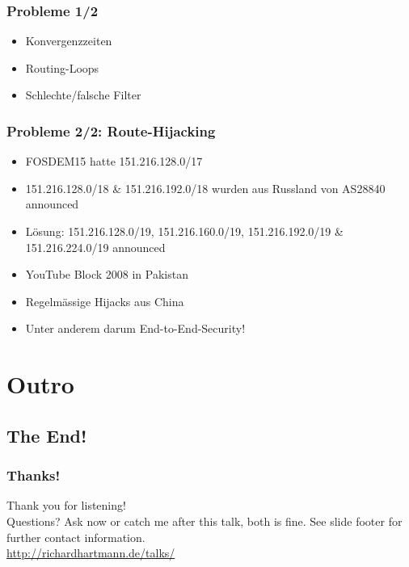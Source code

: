 \documentclass[t]{beamer}
\begin{document}
\begin{frame}
	\frametitle{Probleme 1/2}
	\begin{itemize}
		\item Konvergenzzeiten
		\item Routing-Loops
		\item Schlechte/falsche Filter
	\end{itemize}
\end{frame}

\begin{frame}
	\frametitle{Probleme 2/2: Route-Hijacking}
	\begin{itemize}
		\item FOSDEM15 hatte 151.216.128.0/17
		\item 151.216.128.0/18 \& 151.216.192.0/18 wurden aus Russland von AS28840 announced
		\item L\"osung: 151.216.128.0/19, 151.216.160.0/19, 151.216.192.0/19 \& 151.216.224.0/19 announced
		\item YouTube Block 2008 in Pakistan
		\item Regelm\"assige Hijacks aus China
		\item Unter anderem darum End-to-End-Security!
	\end{itemize}
\end{frame}


\section{Outro}

\subsection{The End!}

\begin{frame}
	\frametitle{Thanks!}
		\begin{center}
			\vfill
			Thank you for listening!\\
			\vfill
			Questions? Ask now or catch me after this talk, both is fine.
			\vfill
			See slide footer for further contact information.\\
			\vfill
			\url{http://richardhartmann.de/talks/}
			\vfill
		\end{center}
\end{frame}
\end{document}
